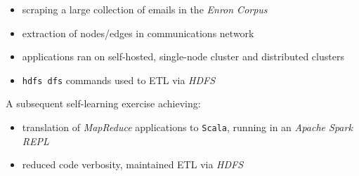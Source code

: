 \documentclass[letterpaper,11pt]{article}
\begin{document}
\begin{description}[style=multiline,leftmargin=3cm]
\begin{description}[style=multiline,leftmargin=2.5cm]
\begin{itemize}
			            \item scraping a large collection of emails in the \textit{Enron Corpus}
			            \item extraction of nodes/edges in communications network
		            \end{itemize}
		      \item[Hadoop]
		            \begin{itemize}
			            \item applications ran on self-hosted, single-node cluster and distributed clusters
			            \item \texttt{hdfs dfs} commands used to ETL via \textit{HDFS}
		            \end{itemize}
		      \item[Spark] A subsequent self-learning exercise achieving:
		            \begin{itemize}
			            \item translation of \textit{MapReduce} applications to \texttt{Scala}, running in an \textit{Apache Spark REPL}
			            \item reduced code verbosity, maintained ETL via \textit{HDFS}
		            \end{itemize}


\end{description}
\end{description}
\end{document}
